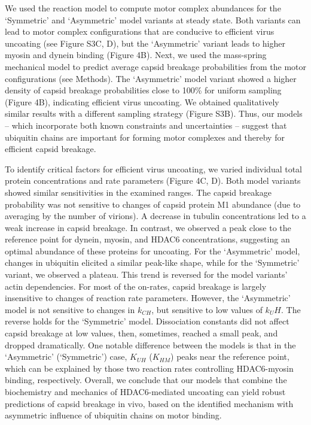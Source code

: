 We used the reaction model to compute motor complex abundances for the ‘Symmetric’ and ‘Asymmetric’ model variants at steady state. Both variants can lead to motor complex configurations that are conducive to efficient virus uncoating (see Figure S3C, D), but the ‘Asymmetric’ variant leads to higher myosin and dynein binding (Figure 4B). Next, we used the mass-spring mechanical model to predict average capsid breakage probabilities from the motor configurations (see Methods). The ‘Asymmetric’ model variant showed a higher density of capsid breakage probabilities close to 100\% for uniform sampling (Figure 4B), indicating efficient virus uncoating. We obtained qualitatively similar results with a different sampling strategy (Figure S3B). Thus, our models – which incorporate both known constraints and uncertainties – suggest that ubiquitin chains are important for forming motor complexes and thereby for efficient capsid breakage.

To identify critical factors for efficient virus uncoating, we varied individual total protein concentrations and rate parameters (Figure 4C, D). Both model variants showed similar sensitivities in the examined ranges. The capsid breakage probability was not sensitive to changes of capsid protein M1 abundance (due to averaging by the number of virions). A decrease in tubulin concentrations led to a weak increase in capsid breakage. In contrast, we observed a peak close to the reference point for dynein, myosin, and HDAC6 concentrations, suggesting an optimal abundance of these proteins for uncoating. For the ‘Asymmetric’ model, changes in ubiquitin elicited a similar peak-like shape, while for the ‘Symmetric’ variant, we observed a plateau. This trend is reversed for the model variants’ actin dependencies. For most of the on-rates, capsid breakage is largely insensitive to changes of reaction rate parameters. However, the ‘Asymmetric’ model is not sensitive to changes in  $k_{CH}$, but sensitive to low values of $k_UH$. The reverse holds for the ‘Symmetric’ model. Dissociation constants did not affect capsid breakage at low values, then, sometimes, reached a small peak, and dropped dramatically. One notable difference between the models is that in the ‘Asymmetric’ (‘Symmetric’) case, $K_{UH}$ ($K_{HM}$) peaks near the reference point, which can be explained by those two reaction rates controlling HDAC6-myosin binding, respectively. Overall, we conclude that our models that combine the biochemistry and mechanics of HDAC6-mediated uncoating can yield robust predictions of capsid breakage in vivo, based on the identified mechanism with asymmetric influence of ubiquitin chains on motor binding.

